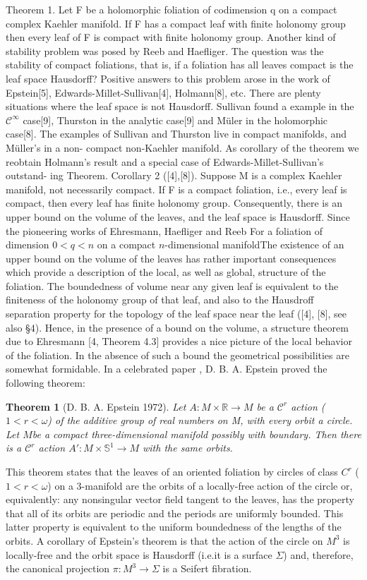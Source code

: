 \documentclass[12pt,twoside,a4paper]{report}
\newtheorem{theorem}{Theorem}[section]
\newcommand{\ie}{i.e.}
\newcommand{\re}{\ensuremath{\mathbb R }}
\newcommand{\csheaf}{\ensuremath{\mathcal C }}
\newcommand{\sph}{\ensuremath{\mathbb S }}
\begin{document}
Theorem 1. Let F be a holomorphic foliation of codimension q on a compact complex Kaehler manifold. If F has a compact leaf with finite holonomy group then every leaf of F is compact with finite holonomy group.
Another kind of stability problem was posed by Reeb and Haefliger. The question was the stability of compact foliations, that is, if a foliation has all leaves compact is the leaf space Hausdorff? Positive answers to
this problem arose in the work of Epstein[5], Edwards-Millet-Sullivan[4], Holmann[8], etc. There are plenty situations where the leaf space is not Hausdorff. Sullivan found a example in the $\csheaf^\infty$ case[9], Thurston in the analytic case[9] and Müler in the holomorphic case[8]. The examples of Sullivan and Thurston live in compact manifolds, and Müller’s in a non- compact non-Kaehler manifold. As corollary of the theorem we reobtain Holmann’s result and a special case of Edwards-Millet-Sullivan’s outstand- ing Theorem.
Corollary 2 ([4],[8]). Suppose M is a complex Kaehler manifold, not necessarily compact. If F is a compact foliation, i.e., every leaf is compact, then every leaf has finite holonomy group. Consequently, there is an upper bound on the volume of the leaves, and the leaf space is Hausdorff.
Since the pioneering works of Ehresmann,  Haefliger and Reeb For a foliation of dimension $0<q<n$ on a compact $n$-dimensional manifoldThe existence of an upper bound on the volume of the leaves has rather important consequences which provide a description of the local, as well as global, structure of the foliation. The boundedness of volume near any given leaf is equivalent to the finiteness of the holonomy group of that leaf, and also to the Hausdroff separation property for the topology of the leaf space near the leaf ([4], [8], see also §4). Hence, in the presence of a bound on the volume, a structure theorem due to Ehresmann [4, Theorem 4.3] provides a nice picture of the local behavior of the foliation. In the absence of such a bound the geometrical possibilities are somewhat formidable.
In a celebrated paper \cite{Ep2}, D. B. A. Epstein proved the following theorem:
\begin{theorem}[D. B. A. Epstein 1972] Let $A: M \times \re\rightarrow{M}$ be a $\csheaf^r$ action 
($1 < r < \omega$) of the additive group of real numbers on M, with every orbit a circle. Let $M $be a compact three-dimensional manifold possibly with boundary. Then there is a $\csheaf^r $ action
$A': M \times \sph^1\to{M}$ with the same orbits.
\end{theorem} 
This theorem states that the leaves of an oriented foliation by circles of class $C^r$  ($1 < r < \omega$)  on a 3-manifold are the orbits of a
locally-free action of the circle or, equivalently: any nonsingular vector field tangent to the leaves,
has the property that all of its orbits are periodic and the periods are uniformly bounded. This latter property is equivalent to the uniform boundedness of the lengths of the orbits. A corollary of Epstein's theorem is that the action of the circle on $M^3$ is locally-free and the orbit space is Hausdorff (\ie it is a surface $\Sigma$) and, therefore, the canonical projection $\pi:M^3\to\Sigma$ is a Seifert fibration.
\end{document}
